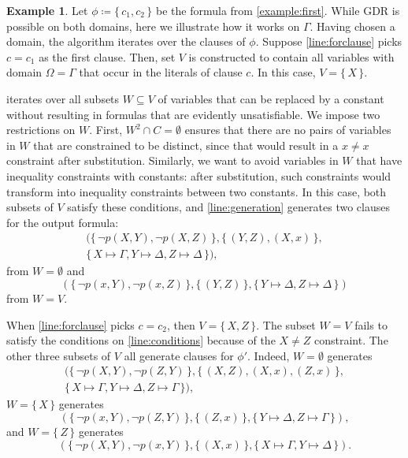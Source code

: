 \documentclass[letterpaper]{article} %
\theoremstyle{definition}
\newtheorem{example}{Example}
\begin{document}
\begin{example}
  Let $\phi \coloneqq \{\, c_1, c_2 \,\}$ be the formula from
  \cref{example:first}. While GDR is possible on both domains, here we
  illustrate how it works on $\Gamma$. Having chosen a domain, the algorithm
  iterates over the clauses of $\phi$. Suppose \cref{line:forclause} picks
  $c = c_1$ as the first clause. Then, set $V$ is constructed to contain all
  variables with domain $\Omega = \Gamma$ that occur in the literals of clause
  $c$. In this case, $V = \{\, X \,\}$.

   iterates over all subsets $W \subseteq V$ of variables
  that can be replaced by a constant without resulting in formulas that are
  evidently unsatisfiable. We impose two restrictions on $W$. First,
  $W^2 \cap C = \emptyset$ ensures that there are no pairs of variables in $W$
  that are constrained to be distinct, since that would result in a $x \ne x$
  constraint after substitution. Similarly, we want to avoid variables in $W$
  that have inequality constraints with constants: after substitution, such
  constraints would transform into inequality constraints between two constants.
  In this case, both subsets of $V$ satisfy these conditions, and
  \cref{line:generation} generates two clauses for the output formula:
  \begin{multline*}
    (\{\, \neg p(X, Y), \neg p(X, Z) \,\}, \{\, (Y, Z), (X, x) \,\}, \\
    \{\, X \mapsto \Gamma, Y \mapsto \Delta, Z \mapsto \Delta \,\}),
  \end{multline*}
  from $W = \emptyset$ and
  \[
    (\{\, \neg p(x, Y), \neg p(x, Z) \,\}, \{\, (Y, Z) \,\}, \{\, Y \mapsto \Delta, Z \mapsto \Delta \,\})
  \]
  from $W = V$.

  When \cref{line:forclause} picks $c = c_2$, then $V = \{\, X, Z \,\}$. The
  subset $W = V$ fails to satisfy the conditions on \cref{line:conditions}
  because of the $X \ne Z$ constraint. The other three subsets of $V$ all
  generate clauses for $\phi'$. Indeed, $W = \emptyset$ generates
  \begin{multline*}
    (\{\, \neg p(X, Y), \neg p(Z, Y) \,\}, \{\, (X, Z), (X, x), (Z, x) \,\}, \\
    \{\, X \mapsto \Gamma, Y \mapsto \Delta, Z \mapsto \Gamma \,\}),
  \end{multline*}
  $W = \{\, X \,\}$ generates
  \[
    (\{\, \neg p(x, Y), \neg p(Z, Y) \,\}, \{\, (Z, x) \,\}, \{\, Y \mapsto \Delta, Z \mapsto \Gamma \,\}),
  \]
  and $W = \{\, Z \,\}$ generates
  \[
    (\{\, \neg p(X, Y), \neg p(x, Y) \,\}, \{\, (X, x) \,\}, \{\, X \mapsto \Gamma, Y \mapsto \Delta \,\}).
  \]
\end{example}
\end{document}
